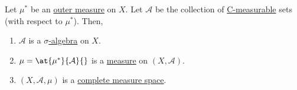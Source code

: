 \begin{theorem}\label{thm:Caratheodory-extension-Thm}
	Let \(\mu^{*} \) be an \hyperref[def:outer-measure]{outer measure} on \(X\). Let \(\mathcal{A} \) be the collection of \hyperref[def:C-measurable]{C-measurable} sets (with respect to \(\mu^{*} \)).
	Then,
	\begin{enumerate}
		\item \(\mathcal{A}\) is a \hyperref[def:sigma-algebra]{\(\sigma\)-algebra} on \(X\).
		\item \(\mu = \at{\mu^{*} }{\mathcal{A} }{}\) is a \hyperref[def:measure]{measure} on \((X, \mathcal{A})\).
		\item \((X, \mathcal{A} , \mu)\) is a \hyperref[def:complete-measure-space]{complete measure space}.
	\end{enumerate}
\end{theorem}

